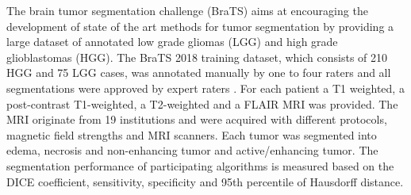 \documentclass{templates/llncs} %
\begin{document}
	The brain tumor segmentation challenge (BraTS) \cite{menze2015multimodal} aims at encouraging the development of state of the art methods for tumor segmentation by providing a large dataset of annotated low grade gliomas (LGG) and high grade glioblastomas (HGG). The BraTS 2018 training dataset, which consists of 210 HGG and 75 LGG cases, was annotated manually by one to four raters and all segmentations were approved by expert raters \cite{bakas_data,bakas_data_2,bakas_data_3}. For each patient a T1 weighted, a post-contrast T1-weighted, a T2-weighted and a FLAIR MRI was provided. The MRI originate from 19 institutions and were acquired with different protocols, magnetic field strengths and MRI scanners. Each tumor was segmented into edema, necrosis and non-enhancing tumor and active/enhancing tumor. The segmentation performance of participating algorithms is measured based on the DICE coefficient, sensitivity, specificity and 95th percentile of Hausdorff distance.
	
\end{document}
